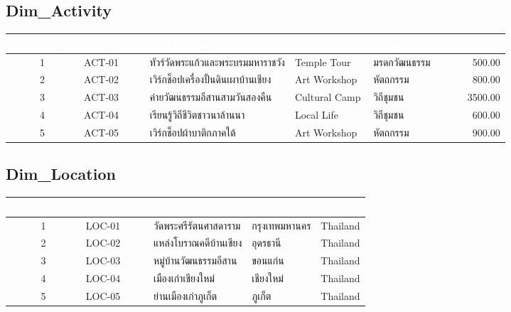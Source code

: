 \documentclass[11pt]{article}
\begin{document}
\subsection*{Dim_Activity}
\begin{adjustbox}{max width=\linewidth}
\begin{tabular}{@{}c l l l l r@{}}
\toprule
\rowcolor{tblHead}\textcolor{white}{activity_key} & \textcolor{white}{activity_id} & \textcolor{white}{activity_name} & \textcolor{white}{activity_type} & \textcolor{white}{category_th} & \textcolor{white}{base_price}\\
\midrule
1 & ACT-01 & ทัวร์วัดพระแก้วและพระบรมมหาราชวัง & Temple Tour & มรดกวัฒนธรรม & 500.00\\
2 & ACT-02 & เวิร์กช็อปเครื่องปั้นดินเผาบ้านเชียง & Art Workshop & หัตถกรรม & 800.00\\
3 & ACT-03 & ค่ายวัฒนธรรมอีสานสามวันสองคืน & Cultural Camp & วิถีชุมชน & 3500.00\\
4 & ACT-04 & เรียนรู้วิถีชีวิตชาวนาล้านนา & Local Life & วิถีชุมชน & 600.00\\
5 & ACT-05 & เวิร์กช็อปผ้าบาติกภาคใต้ & Art Workshop & หัตถกรรม & 900.00\\
\bottomrule
\end{tabular}
\end{adjustbox}

\subsection*{Dim_Location}
\begin{adjustbox}{max width=\linewidth}
\begin{tabular}{@{}c l l l l@{}}
\toprule
\rowcolor{tblHead}\textcolor{white}{location_key} & \textcolor{white}{location_id} & \textcolor{white}{venue_name} & \textcolor{white}{province} & \textcolor{white}{country}\\
\midrule
1 & LOC-01 & วัดพระศรีรัตนศาสดาราม & กรุงเทพมหานคร & Thailand\\
2 & LOC-02 & แหล่งโบราณคดีบ้านเชียง & อุดรธานี & Thailand\\
3 & LOC-03 & หมู่บ้านวัฒนธรรมอีสาน & ขอนแก่น & Thailand\\
4 & LOC-04 & เมืองเก่าเชียงใหม่ & เชียงใหม่ & Thailand\\
5 & LOC-05 & ย่านเมืองเก่าภูเก็ต & ภูเก็ต & Thailand\\
\bottomrule
\end{tabular}
\end{adjustbox}
\end{document}
